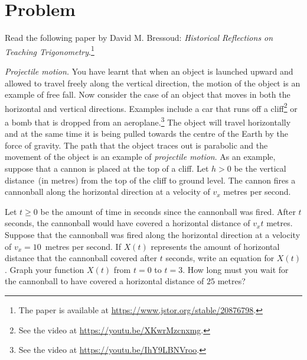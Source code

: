 \documentclass[a4paper,oneside,12pt]{article}
\begin{document}
\newpage

\section*{Problem}

\begin{problem}
\item Read the following paper by David M. Bressoud:
  \emph{Historical Reflections on Teaching Trigonometry}.\footnote{
    The paper is available at
    \url{https://www.jstor.org/stable/20876798}.
  }

\item\emph{Projectile motion.}
  You have learnt that when an object is launched upward and allowed
  to travel freely along the vertical direction, the motion of the
  object is an example of free fall.  Now consider the case of an
  object that moves in both the horizontal and vertical directions.
  Examples include a car that runs off a cliff\footnote{
    See the video at
    \url{https://youtu.be/XKwrMzcnxmg}.
  }
  or a bomb that is dropped from an aeroplane.\footnote{
    See the video at
    \url{https://youtu.be/IhY9LBNVroo}.
  }
  The object will travel horizontally and at the same time it is being
  pulled towards the centre of the Earth by the force of gravity.  The
  path that the object traces out is parabolic and the movement of the
  object is an example of \emph{projectile motion}.  As an example,
  suppose that a cannon is placed at the top of a cliff.  Let $h > 0$
  be the vertical distance~(in metres) from the top of the cliff to
  ground level.  The cannon fires a cannonball along the horizontal
  direction at a velocity of $v_x$ metres per second.
  \begin{packedenum}
  \item\label{subprob:trigonometric:cannon_cliff_horizontal_displacement}
    Let $t \geq 0$ be the amount of time in seconds since the
    cannonball was fired.  After $t$ seconds, the cannonball would
    have covered a horizontal distance of $v_xt$ metres.  Suppose that
    the cannonball was fired along the horizontal direction at a
    velocity of $v_x = 10$~metres per second.  If $X(t)$ represents
    the amount of horizontal distance that the cannonball covered
    after $t$ seconds, write an equation for $X(t)$.  Graph your
    function $X(t)$ from $t = 0$ to $t = 3$.  How long must you wait
    for the cannonball to have covered a horizontal distance of $25$
    metres?


\end{packedenum}
\end{problem}
\end{document}

